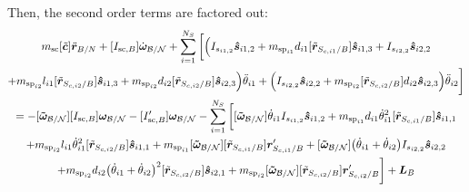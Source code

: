 \documentclass[paper]{aiaaNew}
\begin{document}
Then, the second order terms are factored out:
\begin{multline}
m_{\text{sc}} [\tilde{\bm{c}}] \ddot{\bm r}_{B/N} + [I_{\text{sc},B}] \dot{\bm\omega}_{\cal B/N} + \sum\limits_{i=1}^{N_S} \bigg[\Big(
I_{s_{i1,2}}\bm{\hat{s}}_{i1,2} 
+m_{\text{sp}_{i1}} d_{i1} [\tilde{\bm{r}}_{S_{c,i1}/B}] \bm{\hat{s}}_{i1,3} + I_{s_{i2,2}}\bm{\hat{s}}_{i2,2} \\
+m_{\text{sp}_{i2}} l_{i1} [\tilde{\bm{r}}_{S_{c,i2}/B}] \bm{\hat{s}}_{i1,3}
+m_{\text{sp}_{i2}} d_{i2} [\tilde{\bm{r}}_{S_{c,i2}/B}] \bm{\hat{s}}_{i2,3}\Big) \ddot{\theta}_{i1}
+\Big(I_{s_{i2,2}}\bm{\hat{s}}_{i2,2} 
+m_{\text{sp}_{i2}} [\tilde{\bm{r}}_{S_{c,i2}/B}] d_{i2}\bm{\hat{s}}_{i2,3}\Big) \ddot{\theta}_{i2} \bigg]\\
 = -[\bm{\tilde{\omega}}_{\cal B/N}] [I_{\text{sc},B}] \bm\omega_{\cal B/N} - [I'_{\text{sc},B}] \bm\omega_{\cal B/N} 
-  \sum\limits_{i=1}^{N_S} \bigg[
[\bm{\tilde{\omega}}_{\cal B/N}] \dot{\theta}_{i1} I_{s_{i1,2}}\bm{\hat{s}}_{i1,2} 
+m_{\text{sp}_{i1}} d_{i1} \dot{\theta}_{i1}^2 [\tilde{\bm{r}}_{S_{c,i1}/B}] \bm{\hat{s}}_{i1,1}
\\+m_{\text{sp}_{i2}} l_{i1} \dot{\theta}_{i1}^2 [\tilde{\bm{r}}_{S_{c,i2}/B}] \bm{\hat{s}}_{i1,1}
+m_{\text{sp}_{i1}} [\bm{\tilde{\omega}}_{\cal B/N}] [\tilde{\bm{r}}_{S_{c,i1}/B}] \bm{r}'_{S_{c,i1}/B}
+ [\bm{\tilde{\omega}}_{\cal B/N}] \big(\dot{\theta}_{i1}+\dot{\theta}_{i2}\big) I_{s_{i2,2}}\bm{\hat{s}}_{i2,2}
\\
+m_{\text{sp}_{i2}} d_{i2}\big(\dot{\theta}_{i1} + \dot{\theta}_{i2}\big)^2 [\tilde{\bm{r}}_{S_{c,i2}/B}] \bm{\hat{s}}_{i2,1}
+m_{\text{sp}_{i2}} [\bm{\tilde{\omega}}_{\cal B/N}] [\tilde{\bm{r}}_{S_{c,i2}/B}] \bm{r}'_{S_{c,i2}/B}\bigg]
+ \bm{L}_B
\label{eq:Finalint}
\end{multline}
\end{document}
